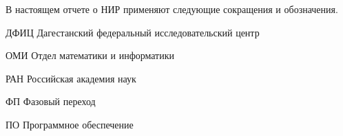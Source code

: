\documentclass[utf8,usehyperref,12pt]{G7-32}
\begin{document}

\frontmatter %

\NirTitle{}

\Executors %
\begin{longtable}{p{0.35\linewidth}p{0.2\linewidth}p{0.35\linewidth}}

\end{longtable}



\setcounter{tocdepth}{2} %

\tableofcontents


\Abbreviations %
В настоящем отчете о НИР применяют следующие сокращения и обозначения.
\begin{abbreviation}
\item[ДФИЦ] Дагестанский федеральный исследовательский центр
\item[ОМИ] Отдел математики и информатики
\item[РАН] Российская академия наук
\item[ФП] Фазовый переход
\item[ПО] Программное обеспечение
\end{abbreviation}



\mainmatter %



\backmatter %



\end{document}
